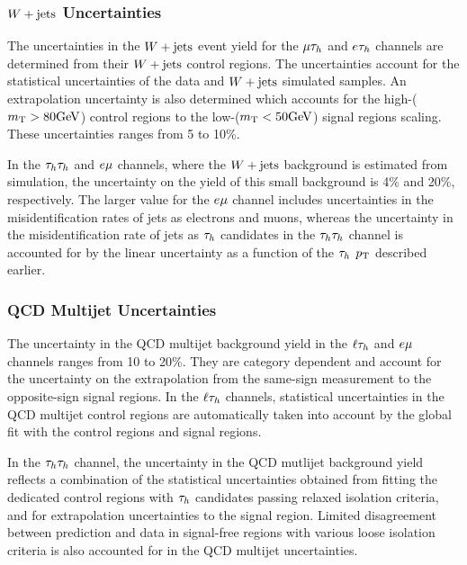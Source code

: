 \subsubsection{$W+\text{jets}$ Uncertainties}
The uncertainties in the $W+\text{jets}$ event yield for the $\mu\tau_{h}$ and $e\tau_{h}$ channels are determined 
from their $W+\text{jets}$ control regions. The uncertainties account for the statistical uncertainties of the
data and $W+\text{jets}$ simulated samples. An extrapolation uncertainty is also determined which accounts for
the high-\MT ($m_\mathrm{T}>80\mathrm{GeV}$) control regions to the low-\MT ($m_\mathrm{T}<50\mathrm{GeV}$) signal regions scaling.
These uncertainties ranges from 5 to 10\%.

In the $\tau_{h}\tau_{h}$ and $e\mu$ channels, where the $W+\text{jets}$ background is estimated from simulation, the 
uncertainty on the yield of this small background is 4\% and 20\%, respectively. The larger value for the 
$e\mu$ channel includes uncertainties in the misidentification rates of jets as electrons and muons, whereas the 
uncertainty in the misidentification rate of jets as $\tau_{h}$ candidates in the $\tau_{h}\tau_{h}$ channel is accounted for 
by the linear uncertainty as a function of the $\tau_{h}$ $p_\mathrm{T}$ described earlier.


\subsubsection{QCD Multijet Uncertainties}
The uncertainty in the QCD multijet background yield in the $\ell\tau_{h}$ and $e\mu$ channels ranges from 10 to 20\%.
They are category dependent and account for the uncertainty on the extrapolation from the same-sign measurement to 
the opposite-sign signal regions. In the  $\ell\tau_{h}$ channels, statistical uncertainties in the QCD multijet
control regions are automatically taken into account by the global fit with the control regions and signal regions.

In the $\tau_{h}\tau_{h}$ channel, the uncertainty in the QCD mutlijet background yield reflects a combination of the statistical
uncertainties obtained from fitting the dedicated control regions with $\tau_{h}$ candidates passing relaxed isolation 
criteria, and for extrapolation uncertainties to the signal region. Limited 
disagreement between prediction and data in signal-free regions with various loose isolation criteria is also accounted
for in the QCD multijet uncertainties. 

